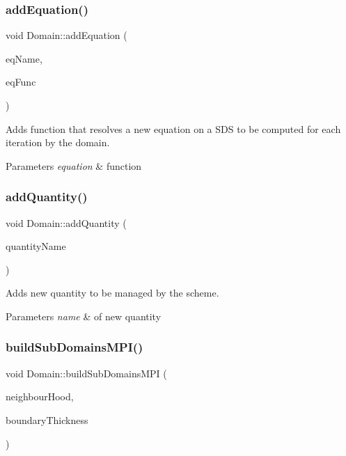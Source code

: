 \subsubsection{\texorpdfstring{add\+Equation()}{addEquation()}}
{\footnotesize\ttfamily void Domain\+::add\+Equation (\begin{DoxyParamCaption}\item[{std\+::string}]{eq\+Name,  }\item[{eq\+Type}]{eq\+Func }\end{DoxyParamCaption})}



Adds function that resolves a new equation on a S\+DS to be computed for each iteration by the domain. 


\begin{DoxyParams}{Parameters}
{\em equation} & function \\
\hline
\end{DoxyParams}
\mbox{\label{classDomain_a9c33ac08523c95967ad2a51c59fd8d96}} 
\subsubsection{\texorpdfstring{add\+Quantity()}{addQuantity()}}
{\footnotesize\ttfamily void Domain\+::add\+Quantity (\begin{DoxyParamCaption}\item[{std\+::string}]{quantity\+Name }\end{DoxyParamCaption})}



Adds new quantity to be managed by the scheme. 


\begin{DoxyParams}{Parameters}
{\em name} & of new quantity \\
\hline
\end{DoxyParams}
\mbox{\label{classDomain_a310ab6016f9631f96db2727e19850744}} 
\subsubsection{\texorpdfstring{build\+Sub\+Domains\+M\+P\+I()}{buildSubDomainsMPI()}}
{\footnotesize\ttfamily void Domain\+::build\+Sub\+Domains\+M\+PI (\begin{DoxyParamCaption}\item[{unsigned int}]{neighbour\+Hood,  }\item[{unsigned int}]{boundary\+Thickness }\end{DoxyParamCaption})}



